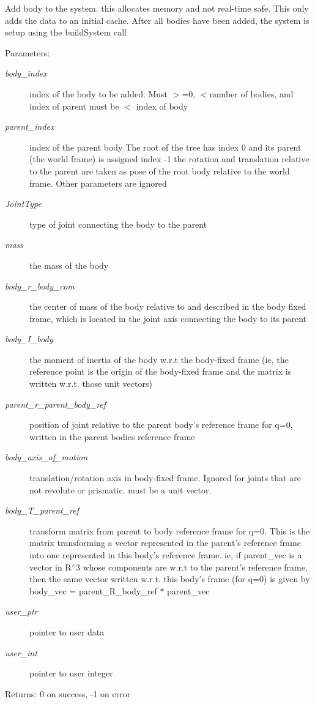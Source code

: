 Add body to the system. this allocates memory and not real-time safe. This only adds the data to an initial cache. After all bodies have been added, the system is setup using the buildSystem call \begin{Desc}
\item[Parameters:]
\begin{description}
\item[{\em body\_\-index}]index of the body to be added. Must $>$=0, $<$number of bodies, and index of parent must be $<$ index of body \item[{\em parent\_\-index}]index of the parent body The root of the tree has index 0 and its parent (the world frame) is assigned index -1 the rotation and translation relative to the parent are taken as pose of the root body relative to the world frame. Other parameters are ignored \item[{\em JointType}]type of joint connecting the body to the parent \item[{\em mass}]the mass of the body \item[{\em body\_\-r\_\-body\_\-com}]the center of mass of the body relative to and described in the body fixed frame, which is located in the joint axis connecting the body to its parent \item[{\em body\_\-I\_\-body}]the moment of inertia of the body w.r.t the body-fixed frame (ie, the reference point is the origin of the body-fixed frame and the matrix is written w.r.t. those unit vectors) \item[{\em parent\_\-r\_\-parent\_\-body\_\-ref}]position of joint relative to the parent body's reference frame for q=0, written in the parent bodies reference frame \item[{\em body\_\-axis\_\-of\_\-motion}]translation/rotation axis in body-fixed frame. Ignored for joints that are not revolute or prismatic. must be a unit vector. \item[{\em body\_\-T\_\-parent\_\-ref}]transform matrix from parent to body reference frame for q=0. This is the matrix transforming a vector represented in the parent's reference frame into one represented in this body's reference frame. ie, if parent\_\-vec is a vector in R$^\wedge$3 whose components are w.r.t to the parent's reference frame, then the same vector written w.r.t. this body's frame (for q=0) is given by body\_\-vec = parent\_\-R\_\-body\_\-ref $\ast$ parent\_\-vec \item[{\em user\_\-ptr}]pointer to user data \item[{\em user\_\-int}]pointer to user integer \end{description}
\end{Desc}
\begin{Desc}
\item[Returns:]0 on success, -1 on error \end{Desc}
 

